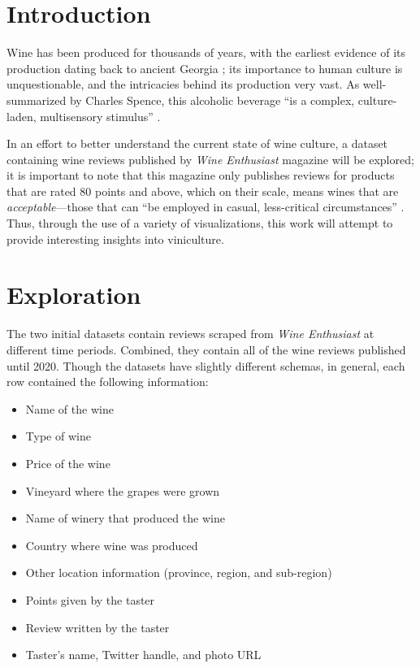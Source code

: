 \section{Introduction}
Wine has been produced for thousands of years, with the earliest evidence of its production dating back to ancient Georgia \cite{McGovernJalabadze2017}; its importance to human culture is unquestionable, and the intricacies behind its production very vast. As well-summarized by Charles Spence, this alcoholic beverage ``is a complex, culture-laden, multisensory stimulus'' \cite{Spence2020}.

In an effort to better understand the current state of wine culture, a dataset containing wine reviews published by \emph{Wine Enthusiast} magazine will be explored; it is important to note that this magazine only publishes reviews for products that are rated 80 points and above, which on their scale, means wines that are \emph{acceptable}---those that can ``be employed in casual, less-critical circumstances'' \cite{WineMag}. Thus, through the use of a variety of visualizations, this work will attempt to provide interesting insights into viniculture.


\section{Exploration}
The two initial datasets contain reviews scraped from \emph{Wine Enthusiast} at different time periods. Combined, they contain all of the wine reviews published until 2020. Though the datasets have slightly different schemas, in general, each row contained the following information:

\begin{itemize}
    \setlength\itemsep{0.1em}
    \item Name of the wine
    \item Type of wine
    \item Price of the wine
    \item Vineyard where the grapes were grown
    \item Name of winery that produced the wine
    \item Country where wine was produced
    \item Other location information (province, region, and sub-region)
    \item Points given by the taster
    \item Review written by the taster
    \item Taster's name, Twitter handle, and photo URL
\end{itemize}

